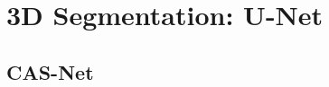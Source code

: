 
\section{3D Segmentation: U-Net}
\label{sec:tech-unet}

\subsection{CAS-Net}
\label{sec:tech-casnet}
